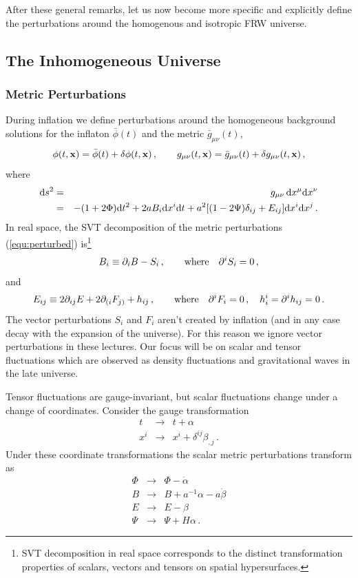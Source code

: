 \documentclass[12pt,letterpaper,rotate]{article}
\def\beq{\begin{equation}}
\def\eeq{\end{equation}}
\def\bea{\begin{eqnarray}}
\def\eea{\end{eqnarray}}
\def\d{{\rm d}}
\begin{document}
{\vskip 8pt
After these general remarks, let us now become more specific and explicitly define the perturbations around the homogenous and isotropic FRW universe.


\subsection{The Inhomogeneous Universe}

\subsubsection{Metric Perturbations}
During inflation we define perturbations around the homogeneous background solutions for the inflaton $\bar
\phi(t)$ and the metric $\bar g_{\mu \nu}(t)$, \beq \phi(t, {\bf x}) = \bar \phi(t)
+ \delta \phi(t, {\bf x})\, , \qquad g_{\mu \nu}(t, {\bf x}) = \bar g_{\mu \nu}(t) + \delta g_{\mu \nu}(t, {\bf
x})\, , \eeq 
where 
\bea
\d s^2 &=& g_{\mu \nu}\, \d x^\mu \d x^\nu \nonumber \\
&=& -(1+2 \Phi) \d t^2 + 2 a B_i \d x^i \d t + a^2 [(1-2 \Psi) \delta_{ij} + E_{ij}] \d x^i \d x^j\, .
\label{equ:perturbed} 
\eea
 In real space, the SVT decomposition of the metric perturbations
(\ref{equ:perturbed}) is\footnote{SVT decomposition in real space corresponds to the distinct transformation
properties of scalars, vectors and tensors on spatial hypersurfaces.} \beq \label{equ:SVT1} B_i \equiv
\partial_i B- S_i\, , \qquad {\rm where} \quad  \partial^i S_i = 0\, , \eeq and \beq \label{equ:SVT2}
 E_{ij} \equiv 2 \partial_{ij} E + 2 \partial_{(i} F_{j)} + h_{ij}\, ,  \qquad {\rm where} \quad \partial^i F_i =0\, , \quad h^i_{i} = \partial^i h_{ij} = 0\, .
\eeq
The vector perturbations $S_i$ and $F_i$ aren't created by inflation (and in any case decay with the expansion of the universe). For this reason we ignore vector perturbations in these lectures.
Our focus will be on scalar and tensor fluctuations which are observed as density fluctuations and gravitational waves in the late universe.

Tensor fluctuations are gauge-invariant, but scalar fluctuations change under a change of coordinates.
Consider the gauge transformation
\bea
t &\to& t + \alpha \\
x^i &\to& x^i + \delta^{ij} \beta_{,j}\, .
\eea
Under these coordinate transformations the scalar metric perturbations transform as
\bea
\Phi &\to& \Phi - \dot \alpha\label{equ:d1} \\
B &\to& B + a^{-1} \alpha - a \dot \beta \\
E &\to& E - \beta \\
\Psi &\to& \Psi + H \alpha\, . \label{equ:d2}
\eea

}
\end{document}
